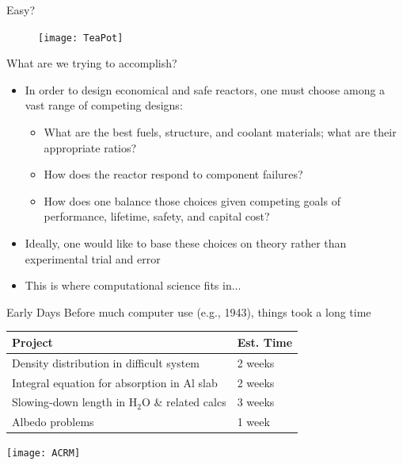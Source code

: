 \documentclass[xcolor=x11names,compress]{beamer}
\renewcommand{\(}{\begin{columns}}
\renewcommand{\)}{\end{columns}}
\newcommand{\<}[1]{\begin{column}{#1}}
\renewcommand{\>}{\end{column}}
\begin{document}
\begin{frame}{Easy?}
 \begin{figure}
   \begin{center}
     \texttt{[image: TeaPot]}
   \end{center}
 \end{figure}
\end{frame}

\begin{frame}{What are we trying to accomplish?}
\begin{itemize}
\item In order to design economical and safe reactors, one must choose among a vast range of competing designs:
\begin{itemize}
\item What are the \alert{best} fuels, structure, and coolant materials; what are their appropriate ratios?
\item How does the reactor respond to component failures?
\item How does one balance those choices given competing goals of performance, lifetime, safety, and capital cost? \vspace*{1 em}
\end{itemize}
\item Ideally, one would like to base these choices on theory rather than experimental trial and error \vspace*{1 em}
\item This is where \textcolor{dgreen}{computational science} fits in...
\end{itemize}
\end{frame}

\begin{frame}{Early Days}
Before much computer use (e.g., 1943), things took a long time
\begin{tabu}{|X | l|}
\hline
Project & Est. Time \\\hline
Density distribution in difficult system & 2 weeks \\
Integral equation for absorption in Al slab & 2 weeks \\
Slowing-down length in H$_2$O \& related calcs & 3 weeks \\
Albedo problems & 1 week \\\hline
\end{tabu}
\begin{center}
\texttt{[image: ACRM]}
\end{center}
\end{frame}
\end{document}
